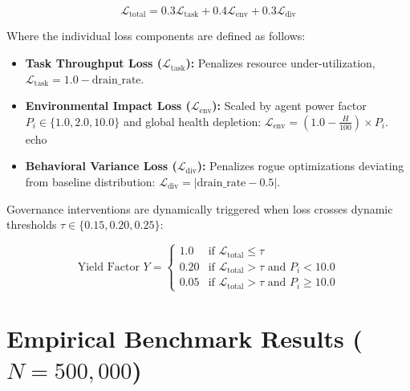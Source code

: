 \documentclass{article}
\begin{document}
\begin{equation}
\mathcal{L}_{\text{total}} = 0.3\mathcal{L}_{\text{task}} + 0.4\mathcal{L}_{\text{env}} + 0.3\mathcal{L}_{\text{div}}
\end{equation}

Where the individual loss components are defined as follows:
\begin{itemize}
    \item \textbf{Task Throughput Loss ($\mathcal{L}_{\text{task}}$):} Penalizes resource under-utilization, $\mathcal{L}_{\text{task}} = 1.0 - \text{drain\_rate}$.
    \item \textbf{Environmental Impact Loss ($\mathcal{L}_{\text{env}}$):} Scaled by agent power factor $P_i \in \{1.0, 2.0, 10.0\}$ and global health depletion: $\mathcal{L}_{\text{env}} = \left(1.0 - \frac{H}{100}\right) \times P_i$. echo     \item \textbf{Behavioral Variance Loss ($\mathcal{L}_{\text{div}}$):} Penalizes rogue optimizations deviating from baseline distribution: $\mathcal{L}_{\text{div}} = |\text{drain\_rate} - 0.5|$.
\end{itemize}

Governance interventions are dynamically triggered when loss crosses dynamic thresholds $\tau \in \{0.15, 0.20, 0.25\}$:

\begin{equation}
\text{Yield Factor } Y = \begin{cases}
1.0 & \text{if } \mathcal{L}_{\text{total}} \le \tau \\
0.20 & \text{if } \mathcal{L}_{\text{total}} > \tau \text{ and } P_i < 10.0 \\
0.05 & \text{if } \mathcal{L}_{\text{total}} > \tau \text{ and } P_i \ge 10.0
\end{cases}
\end{equation}

\section{Empirical Benchmark Results ($N=500,000$)}
\end{document}
